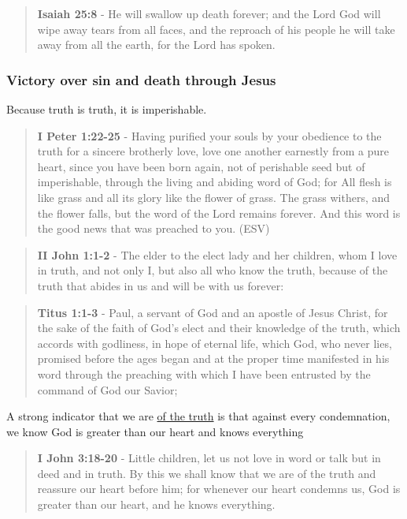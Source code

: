 \documentclass[11pt]{article}
\begin{document}
\begin{quote}
\textbf{Isaiah 25:8} - He will swallow up death forever; and the Lord God will wipe away tears from all faces, and the reproach of his people he will take away from all the earth, for the Lord has spoken.
\end{quote}

\subsubsection{Victory over sin and death through Jesus}
\label{sec:org59a7b11}
Because truth is truth, it is imperishable.

\begin{quote}
\textbf{I Peter 1:22-25} - Having purified your souls by your obedience to the truth for a sincere brotherly love, love one another earnestly from a pure heart, since you have been born again, not of perishable seed but of imperishable, through the living and abiding word of God; for All flesh is like grass and all its glory like the flower of grass. The grass withers, and the flower falls, but the word of the Lord remains forever. And this word is the good news that was preached to you. (ESV)
\end{quote}

\begin{quote}
\textbf{II John 1:1-2} - The elder to the elect lady and her children, whom I love in truth, and not only I, but also all who know the truth, because of the truth that abides in us and will be with us forever:
\end{quote}

\begin{quote}
\textbf{Titus 1:1-3} - Paul, a servant of God and an apostle of Jesus Christ, for the sake of the faith of God's elect and their knowledge of the truth, which accords with godliness, in hope of eternal life, which God, who never lies, promised before the ages began and at the proper time manifested in his word through the preaching with which I have been entrusted by the command of God our Savior;
\end{quote}

A strong indicator that we are \uline{of the truth} is that against every condemnation, we know God is greater than our heart and knows everything

\begin{quote}
\textbf{I John 3:18-20} - Little children, let us not love in word or talk but in deed and in truth. By this we shall know that we are of the truth and reassure our heart before him; for whenever our heart condemns us, God is greater than our heart, and he knows everything.
\end{quote}
\end{document}

